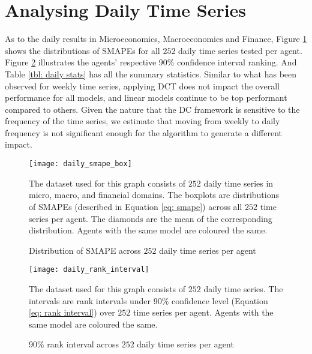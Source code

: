\section{Analysing Daily Time Series}
As to the daily results in Microeconomics, Macroeconomics and Finance, Figure \ref{fig: daily smape box} shows the distributions of SMAPEs for all $252$ daily time series tested per agent. Figure \ref{fig: daily rank interval} illustrates the agents' respective 90\% confidence interval ranking. And Table \ref{tbl: daily stats} has all the summary statistics. Similar to what has been observed for weekly time series, applying DCT does not impact the overall performance for all models, and linear models continue to be top performant compared to others. Given the nature that the DC framework is sensitive to the frequency of the time series, we estimate that moving from weekly to daily frequency is not significant enough for the algorithm to generate a different impact.
\begin{figure}[H]
    \centering
    \texttt{[image: daily\_smape\_box]}
    \caption{Distribution of SMAPE across $252$ daily time series per agent}
    {\raggedright \footnotesize The dataset used for this graph consists of $252$ daily time series in micro, macro, and financial domains. The boxplots are distributions of SMAPEs (described in Equation \ref{eq: smape}) across all $252$ time series per agent. The diamonds are the mean of the corresponding distribution. Agents with the same model are coloured the same. \par}
    \label{fig: daily smape box}
\end{figure}
\begin{figure}[H]
    \centering
    \texttt{[image: daily\_rank\_interval]}
    \caption{90\% rank interval across $252$ daily time series per agent}
    {\raggedright \footnotesize The dataset used for this graph consists of $252$ daily time series. The intervals are rank intervals under 90\% confidence level (Equation \ref{eq: rank interval}) over $252$ time series per agent. Agents with the same model are coloured the same. \par}
    \label{fig: daily rank interval}
\end{figure}
